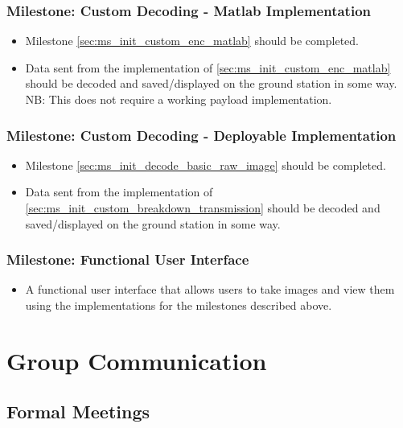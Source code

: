 	\subsubsection{Milestone: Custom Decoding - Matlab Implementation}
		\begin{itemize}
			\item 	Milestone \ref{sec:ms_init_custom_enc_matlab} should be completed.
			\item 	Data sent from the implementation of \ref{sec:ms_init_custom_enc_matlab} should be
				decoded and saved/displayed on the ground station in some way. NB: This does not require
				a working payload implementation.
		\end{itemize}

	\subsubsection{Milestone: Custom Decoding - Deployable Implementation}
		\begin{itemize}
			\item 	Milestone \ref{sec:ms_init_decode_basic_raw_image} should be completed.
			\item 	Data sent from the implementation of \ref{sec:ms_init_custom_breakdown_transmission} should be
				decoded and saved/displayed on the ground station in some way.
		\end{itemize}

	\subsubsection{Milestone: Functional User Interface}
		\begin{itemize}
			\item 	A functional user interface that allows users to take images and view them using the implementations
				for the milestones described above.
		\end{itemize}








\section{Group Communication}
\label{group_comms}
\subsection{Formal Meetings}

